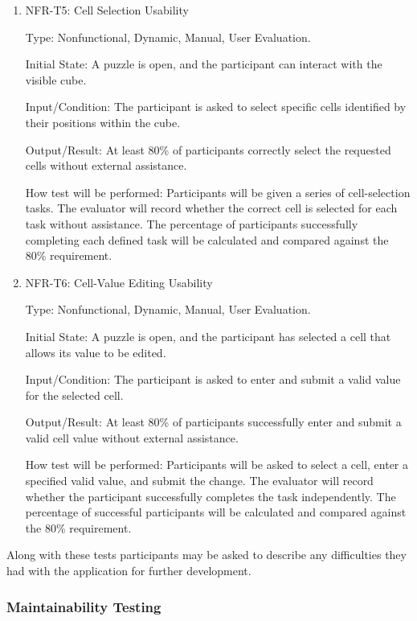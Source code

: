 \documentclass[12pt, titlepage]{article}
\begin{document}
\begin{enumerate}
\item{NFR-T5: Cell Selection Usability\\}

Type: Nonfunctional, Dynamic, Manual, User Evaluation.

Initial State: A puzzle is open, and the participant can interact
with the visible cube.

Input/Condition: The participant is asked to select specific cells
identified by their positions within the cube.

Output/Result: At least 80\% of participants correctly select the
requested cells without external assistance.

How test will be performed: Participants will be given a series of
cell-selection tasks. The evaluator will record whether the correct
cell is selected for each task without assistance. The percentage
of participants successfully completing each defined task will be
calculated and compared against the 80\% requirement.

\item{NFR-T6: Cell-Value Editing Usability\\}

Type: Nonfunctional, Dynamic, Manual, User Evaluation.

Initial State: A puzzle is open, and the participant has selected
a cell that allows its value to be edited.

Input/Condition: The participant is asked to enter and submit a valid
value for the selected cell.

Output/Result: At least 80\% of participants successfully enter and
submit a valid cell value without external assistance.

How test will be performed: Participants will be asked to select
a cell, enter a specified valid value, and submit the change. The
evaluator will record whether the participant successfully completes
the task independently. The percentage of successful participants
will be calculated and compared against the 80\% requirement.

\end{enumerate}

Along with these tests participants may be asked to describe any difficulties
they had with the application for further development.

\subsubsection{Maintainability Testing}
\end{document}
